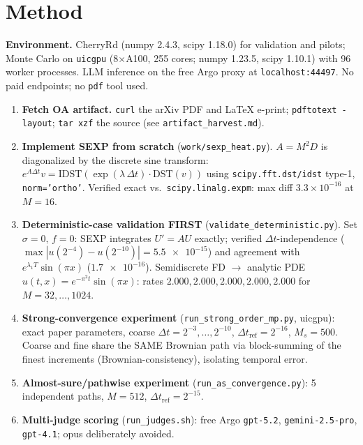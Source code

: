 \documentclass[11pt]{article}
\begin{document}
\section{Method}

\textbf{Environment.} CherryRd (numpy 2.4.3, scipy 1.18.0) for validation and pilots;
Monte Carlo on \texttt{uicgpu} (8$\times$A100, 255 cores; numpy 1.23.5, scipy 1.10.1) with 96
worker processes. LLM inference on the free Argo proxy at \texttt{localhost:44497}. No paid
endpoints; no \texttt{pdf} tool used.

\begin{enumerate}
  \item \textbf{Fetch OA artifact.} \texttt{curl} the arXiv PDF and LaTeX e-print;
        \texttt{pdftotext -layout}; \texttt{tar xzf} the source
        (see \texttt{artifact\_harvest.md}).
  \item \textbf{Implement SEXP from scratch} (\texttt{work/sexp\_heat.py}).
        $A = M^2 D$ is diagonalized by the discrete sine transform:
        $e^{A\Delta t}v = \mathrm{IDST}(\exp(\lambda\,\Delta t)\cdot \mathrm{DST}(v))$
        using \texttt{scipy.fft.dst/idst} type-1, \texttt{norm='ortho'}. Verified exact vs.\
        \texttt{scipy.linalg.expm}: max diff $3.3\times 10^{-16}$ at $M=16$.
  \item \textbf{Deterministic-case validation FIRST} (\texttt{validate\_deterministic.py}).
        Set $\sigma\!=\!0,\,f\!=\!0$: SEXP integrates $U'=AU$ exactly; verified
        $\Delta t$-independence ($\max|u(2^{-4})-u(2^{-10})|=\num{5.5e-15}$) and agreement
        with $e^{\lambda_1 T}\sin(\pi x)$ ($\num{1.7e-16}$). Semidiscrete FD $\to$ analytic
        PDE $u(t,x)=e^{-\pi^2 t}\sin(\pi x)$: rates $2.000, 2.000, 2.000, 2.000, 2.000$ for
        $M=32,\dots,1024$.
  \item \textbf{Strong-convergence experiment} (\texttt{run\_strong\_order\_mp.py}, uicgpu):
        exact paper parameters, coarse $\Delta t = 2^{-3},\dots,2^{-10}$,
        $\Delta t_{\text{ref}}=2^{-16}$, $M_s=500$. Coarse and fine share the SAME
        Brownian path via block-summing of the finest increments
        (Brownian-consistency), isolating temporal error.
  \item \textbf{Almost-sure/pathwise experiment} (\texttt{run\_as\_convergence.py}):
        5 independent paths, $M=512$, $\Delta t_{\text{ref}}=2^{-15}$.
  \item \textbf{Multi-judge scoring} (\texttt{run\_judges.sh}): free Argo \texttt{gpt-5.2},
        \texttt{gemini-2.5-pro}, \texttt{gpt-4.1}; opus deliberately avoided.
\end{enumerate}
\end{document}
